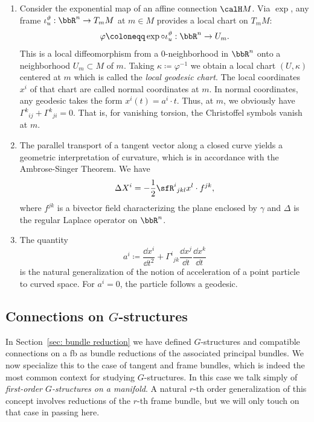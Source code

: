 \begin{rem}\label{rem 2.1.30 RS2}
    \begin{enumerate}
        \item Consider the exponential map of an affine connection $\calH M$. Via $\exp$, any frame $\iota_u^\vartheta:\bbR^n\to T_m M$ at $m\in M$ provides a local chart on $T_mM$:
        \[\varphi\coloneqq \exp\circ \iota_u^\vartheta:\bbR^n\to U_m.\]
        This is a local diffeomorphism from a $0$-neighborhood in $\bbR^n$ onto a  neighborhood $U_m\subset M$ of $m$. Taking $\kappa\coloneqq \varphi^{-1}$ we obtain a local chart $(U,\kappa)$ centered at $m$ which is called the \emph{local geodesic chart}. The local coordinates $x^i$ of that chart are called normal coordinates at $m$. In normal coordinates, any geodesic takes the form $x^i(t)=a^i\cdot t$. Thus, at $m$, we obviously have $\Gamma^k{}_{ij}+\Gamma^k{}_{ji}=0$. That is, for vanishing torsion, the Christoffel symbols vanish at $m$.
        \item The parallel transport of a tangent vector along a closed curve yields a geometric interpretation of curvature, which is in accordance with the Ambrose-Singer Theorem. We have 
        \[\Delta X^i=-\frac12 \sfR^i{}_{jkl}x^l\cdot f^{jk},\]
        where $f^{jk}$ is a bivector field characterizing the plane enclosed by $\gamma$ and $\Delta$ is the regular Laplace operator on $\bbR^n$.
        \item The quantity 
        \[a^i\coloneqq \frac{\dd x^i}{\dd t^2}+\Gamma^i{}_{jk}\frac{\dd x^j}{\dd t}\frac{\dd x^k}{\dd t}\]
        is the natural generalization of the notion of acceleration of a point particle to curved space. For $a^i=0$, the particle follows a geodesic.
    \end{enumerate}
\end{rem}





\subsection{Connections on \texorpdfstring{$G$}{G}-structures}

In Section~\ref{sec: bundle reduction} we have defined $G$-structures and compatible connections on a \gls{fb} as bundle reductions of the associated principal bundles. We now specialize this to the case of tangent and frame bundles, which is indeed the most common context for studying $G$-structures. In this case we talk simply of \emph{first-order $G$-structures on a manifold}. A natural $r$-th order generalization of this concept involves reductions of the $r$-th frame bundle, but we will only touch on that case in passing here.

